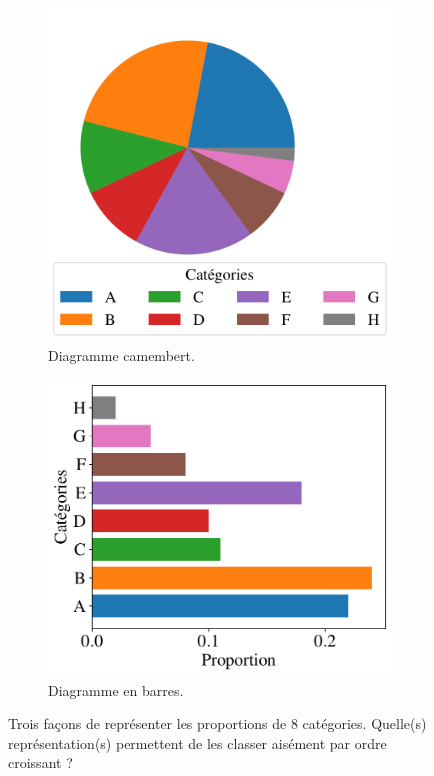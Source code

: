 \begin{figure}[h]
  \begin{subfigure}[t]{0.33\textwidth}
    \includegraphics[width=\textwidth]{figures/pratiques/areas_pie}  
    \caption{Diagramme camembert.}
    \label{fig:areas_pie}
  \end{subfigure} \hfill
  \begin{subfigure}[t]{0.33\textwidth}
    \centering
    \includegraphics[width=\textwidth]{figures/pratiques/areas_bars}
    \caption{Diagramme en barres.}
    \label{fig:areas_bars}
  \end{subfigure} 
  \caption{Trois façons de représenter les proportions de 8 catégories. Quelle(s) représentation(s) permettent de les classer aisément par ordre croissant ?}
  \label{fig:areas}
\end{figure}

